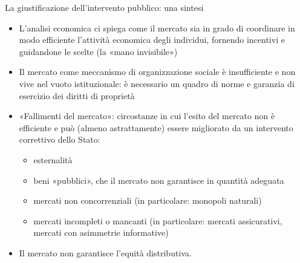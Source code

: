 \documentclass[aspectratio=149,11pt]{beamer}
\begin{document}
\begin{frame}{La giustificazione dell'intervento pubblico: una sintesi}
\begin{itemize}
\item L'analisi economica ci spiega come il mercato sia in grado di coordinare in
modo efficiente l'attività economica degli individui, fornendo incentivi e
guidandone le scelte (la «mano invisibile»)
\item Il mercato come meccanismo di organizzazione sociale è insufficiente e non
vive nel vuoto istituzionale: è necessario un quadro di norme e garanzia di
esercizio dei diritti di proprietà
\item \alert{«Fallimenti del mercato»}: circostanze in cui l'esito del mercato non è
efficiente e può (almeno astrattamente) essere migliorato da un intervento
correttivo dello Stato:
\begin{itemize}
\item esternalità
\item beni «pubblici», che il mercato non garantisce in quantità adeguata
\item mercati non concorrenziali (in particolare: monopoli naturali)
\item mercati incompleti o mancanti (in particolare: mercati assicurativi,
mercati con asimmetrie informative)
\end{itemize}
\item Il mercato non garantisce l'\alert{equità distributiva}.
\end{itemize}
\end{frame}
\end{document}
